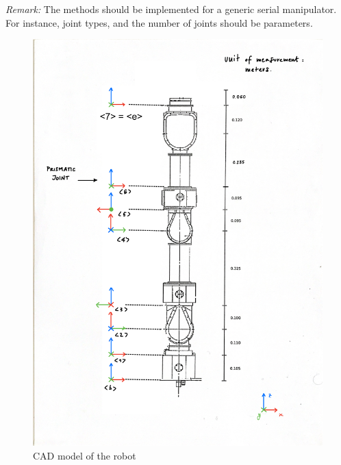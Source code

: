 \textit{Remark:} The methods should be implemented for a generic serial manipulator. For instance, joint types, and the number of joints should be parameters. 

\newpage

\begin{figure} [ht]
\centering
\includegraphics[width=\textwidth*8/10]{Resources/cad_model-1.pdf}
\caption{CAD model of the robot}
\label{fig:ex2}
\end{figure}

\newpage